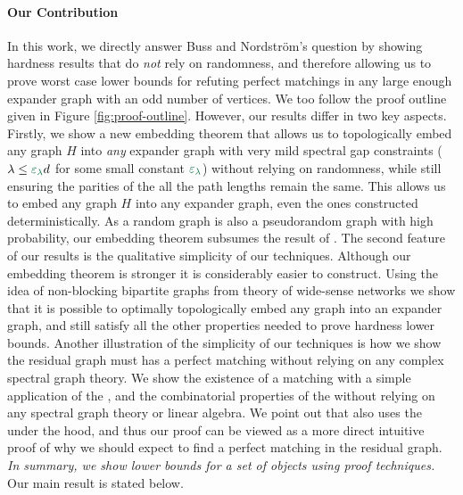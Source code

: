 \documentclass[11pt]{article}
\begin{document}
\paragraph{Our Contribution} In this work, we directly answer Buss and Nordstr{\"o}m's question by showing hardness results that do \emph{not} rely on randomness, and therefore allowing us to prove worst case lower bounds for refuting perfect matchings in any large enough expander graph with an odd number of vertices.
We too follow the proof outline given in Figure \ref{fig:proof-outline}.
However, our results differ in two key aspects.
Firstly, we show a new embedding theorem that allows us to topologically embed any graph $H$ into \emph{any} expander graph with very mild spectral gap constraints ($\lambda \leq \epsilonL d$ for some small constant $\epsilonL$) without relying on randomness, while still ensuring the parities of the all the path lengths remain the same.
This allows us to embed any graph $H$ into any expander graph, even the ones constructed deterministically.
As a random graph is also a pseudorandom graph with high probability, our embedding theorem subsumes the result of \citet{Austrin_2022}.
The second feature of our results is the qualitative simplicity of our techniques.
Although our embedding theorem is stronger it is considerably easier to construct.
Using the idea of non-blocking bipartite graphs from theory of wide-sense networks \citep{feldman1988wide} we show that it is possible to optimally topologically embed any graph into an expander graph, and still satisfy all the other properties needed to prove hardness lower bounds.
Another illustration of the simplicity of our techniques is how we show the residual graph must has a perfect matching without relying on any complex spectral graph theory.
We show the existence of a matching with a simple application of the  , and the combinatorial properties of the  without relying on any spectral graph theory or linear algebra.
We point out that \citep[Theorem 2.3]{brouwer2005eigenvalues} also uses the  under the hood, and thus our proof can be viewed as a more direct intuitive proof of why we should expect to find a perfect matching in the residual graph.
\textit{In summary, we show  lower bounds for a  set of objects using  proof techniques. 
} Our main result is stated below.
\end{document}
